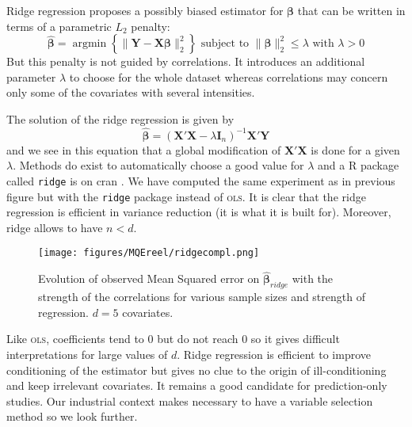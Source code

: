 \documentclass[12pt,a4paper]{report}
\begin{document}
Ridge regression \cite{hoerl1970ridge,marquardt1975ridge} proposes a possibly biased estimator for $\boldsymbol{\beta}$ that can be written in terms of a parametric $L_2$ penalty:
	\begin{equation}
		 \boldsymbol{\hat{\beta}}=\operatorname{argmin} \left\lbrace \parallel \boldsymbol{Y}-\boldsymbol{X\beta}\parallel_2^2 \right\rbrace \textrm{ subject to } \parallel \boldsymbol{\beta} \parallel_2^2\leq \lambda \textrm{ with } \lambda>0
	\end{equation}
	But this penalty is not guided by correlations. It introduces an additional parameter $\lambda$ to choose for the whole dataset  whereas correlations may concern only some of the covariates with several intensities.
	
	The solution of the ridge regression is given by
	\begin{equation}
		 \hat{\boldsymbol{\beta}}=\left(\boldsymbol{X}'\boldsymbol{X} -\lambda\boldsymbol{I}_n\right) ^{-1}\boldsymbol{X}'\boldsymbol{Y}\label{betaridge}
	\end{equation}
	and we see in this equation that a global modification of $\boldsymbol{X}'\boldsymbol{X}$ is done for a given $\lambda$. Methods do exist to automatically choose a good value for $\lambda$ \cite{cule2013ridge,er2013systematic} and a R package called {\tt ridge} is on {\sc cran} \cite{packageridge}. 
	We have computed the same experiment as in previous figure but with the {\tt ridge} package instead of \textsc{ols}. It is clear that the ridge regression is efficient in variance reduction (it is what it is built for). Moreover, ridge allows to have $n<d$.\\
	
	 \begin{figure}
	 \centering
	  \texttt{[image: figures/MQEreel/ridgecompl.png]}
	  \caption{Evolution of observed Mean Squared error on $\hat{\boldsymbol{\beta}}_{ridge}$ with the strength of the correlations for various sample sizes and strength of regression. $d=5$ covariates. } \label{MQEridgecompl}
	\end{figure}
	
	
	Like \textsc{ols}, coefficients tend to 0 but do not reach 0 so it gives difficult interpretations for large values of $d$. Ridge regression is efficient to improve conditioning of the estimator but gives no clue to the origin of ill-conditioning and keep irrelevant covariates. It remains a good candidate for prediction-only studies. Our industrial context makes necessary to have a variable selection method so we look further.
	
\end{document}
